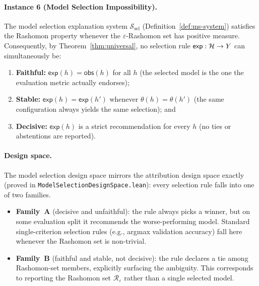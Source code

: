 \paragraph{Instance 6 (Model Selection Impossibility).}

\begin{theorem}
\label{thm:model-selection}
The model selection explanation system $\mathcal{S}_{\mathrm{sel}}$
(Definition~\ref{def:ms-system}) satisfies the Rashomon property
whenever the $\varepsilon$-Rashomon set has positive measure.
Consequently, by Theorem~\ref{thm:universal}, no selection rule
$\mathsf{exp}: \mathcal{H} \to Y$ can simultaneously be:
\begin{enumerate}
  \item \textbf{Faithful:} $\mathsf{exp}(h) = \mathsf{obs}(h)$ for all $h$
    (the selected model is the one the evaluation metric actually endorses);
  \item \textbf{Stable:} $\mathsf{exp}(h) = \mathsf{exp}(h')$ whenever
    $\theta(h) = \theta(h')$ (the same configuration always yields the same
    selection); and
  \item \textbf{Decisive:} $\mathsf{exp}(h)$ is a strict recommendation
    for every $h$ (no ties or abstentions are reported).
\end{enumerate}
\end{theorem}

\paragraph{Design space.}
The model selection design space mirrors the attribution design space
exactly (proved in \texttt{ModelSelectionDesignSpace.lean}): every
selection rule falls into one of two families.
\begin{itemize}
  \item \textbf{Family~A} (decisive and unfaithful): the rule always
    picks a winner, but on some evaluation split it recommends the
    worse-performing model.  Standard single-criterion selection rules
    (e.g., argmax validation accuracy) fall here whenever the Rashomon
    set is non-trivial.
  \item \textbf{Family~B} (faithful and stable, not decisive): the rule
    declares a tie among Rashomon-set members, explicitly surfacing the
    ambiguity.  This corresponds to reporting the Rashomon set
    $\mathcal{R}_\varepsilon$ rather than a single selected model.
\end{itemize}

